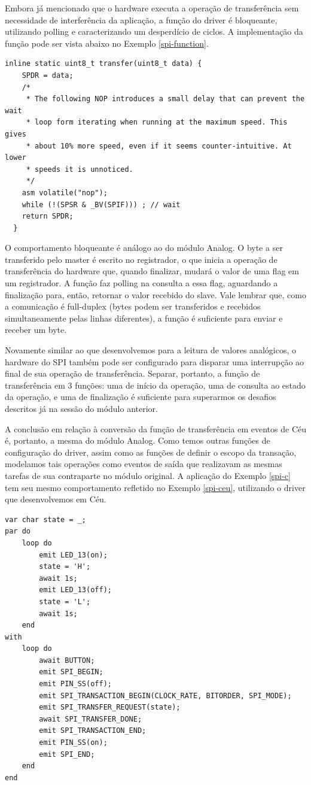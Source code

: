 \documentclass[11pt]{article}
\begin{document}
\par Embora já mencionado que o hardware executa a operação de transferência sem necessidade de interferência da aplicação, a função do driver é bloqueante, utilizando polling e caracterizando um desperdício de ciclos. A implementação da função pode ser vista abaixo no Exemplo \ref{spi-function}. 
\begin{lstlisting}[style=CStyle,label=spi-function,caption=Implementação bloqueante da função de transferência SPI]
  inline static uint8_t transfer(uint8_t data) {
    SPDR = data;
    /*
     * The following NOP introduces a small delay that can prevent the wait
     * loop form iterating when running at the maximum speed. This gives
     * about 10% more speed, even if it seems counter-intuitive. At lower
     * speeds it is unnoticed.
     */
    asm volatile("nop");
    while (!(SPSR & _BV(SPIF))) ; // wait
    return SPDR;
  }
\end{lstlisting}
\par O comportamento bloqueante é análogo ao do módulo Analog. O byte a ser transferido pelo master é escrito no registrador, o que inicia a operação de transferência do hardware que, quando finalizar, mudará o valor de uma flag em um registrador. A função faz polling na consulta a essa flag, aguardando a finalização para, então, retornar o valor recebido do slave. Vale lembrar que, como a comunicação é full-duplex (bytes podem ser transferidos e recebidos simultaneamente pelas linhas diferentes), a função é suficiente para enviar e receber um byte.
\par Novamente similar ao que desenvolvemos para a leitura de valores analógicos, o hardware do SPI também pode ser configurado para disparar uma interrupção ao final de sua operação de transferência. Separar, portanto, a função de transferência em 3 funções: uma de início da operação, uma de consulta ao estado da operação, e uma de finalização é suficiente para superarmos os desafios descritos já na sessão do módulo anterior. 
\par A conclusão em relação à conversão da função de transferência em eventos de Céu é, portanto, a mesma do módulo Analog. Como temos outras funções de configuração do driver, assim como as funções de definir o escopo da transação, modelamos tais operações como eventos de saída que realizavam as mesmas tarefas de sua contraparte no módulo original. A aplicação do Exemplo \ref{spi-c} tem seu mesmo comportamento refletido no Exemplo \ref{spi-ceu}, utilizando o driver que desenvolvemos em Céu.
\begin{lstlisting}[style=CStyle,label=spi-ceu,caption=Aplicação utilizando driver SPI em Céu]
var char state = _;
par do
    loop do
        emit LED_13(on);
        state = 'H';
        await 1s;
        emit LED_13(off);
        state = 'L';
        await 1s;
    end
with
    loop do
        await BUTTON;
        emit SPI_BEGIN;
        emit PIN_SS(off);
        emit SPI_TRANSACTION_BEGIN(CLOCK_RATE, BITORDER, SPI_MODE);
        emit SPI_TRANSFER_REQUEST(state);
        await SPI_TRANSFER_DONE;
        emit SPI_TRANSACTION_END;
        emit PIN_SS(on);
        emit SPI_END;
    end
end
\end{lstlisting}
\end{document}
